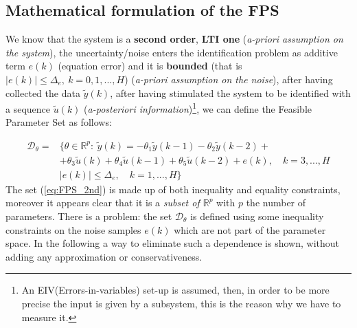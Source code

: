 \subsection{Mathematical formulation of the FPS}
We know that the system is a \textbf{second order}, \textbf{LTI one} (\textit{a-priori assumption on the system}), the uncertainty/noise enters the identification problem as additive term $e(k)$ (equation error) and it is \textbf{bounded} (that is $\vert e(k)\vert \le \Delta_e, \ k=0,1, ..., H$) (\textit{a-priori assumption on the noise}), after having collected the data $\tilde{y}(k)$, after having stimulated the system to be identified with a sequence $\tilde{u}(k)$ (\textit{a-posteriori information})\footnote{
    An EIV(Errors-in-variables) set-up is assumed, then, in order to be more precise the input is given by a subsystem, this is the reason why we have to measure it.
}, we can define the \textsf{Feasible Parameter Set} as follows:

\begin{equation} \label{eq:FPS_2nd}
    \begin{aligned}
        \mathcal{D}_\theta=&\{\theta\in\mathbb{R}^p: \ 
                \tilde{y}(k)=-\theta_1\tilde{y}(k-1)
                -\theta_2\tilde{y}(k-2)+\\
                &+\theta_3\tilde{u}(k)
                +\theta_4\tilde{u}(k-1)
                +\theta_5\tilde{u}(k-2)+e(k), \quad k=3,...,H\\
                &  \vert e(k) \vert \le \Delta_e, \quad k=1,...,H
        \}
    \end{aligned}
\end{equation}
The set (\ref{eq:FPS_2nd}) is made up of both inequality and equality constraints, moreover it appears clear that it is a \textit{subset of $\mathbb{R}^p$} with $p$ the number of parameters. There is a problem: the set $\mathcal{D}_\theta$ is defined using some inequality constraints on the noise samples $e(k)$ which are not part of the parameter space. In the following a way to eliminate such a dependence is shown, without adding any approximation or conservativeness.

